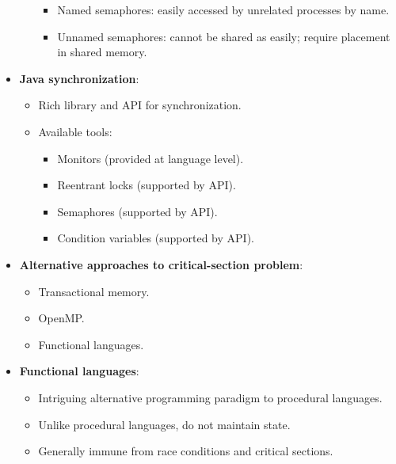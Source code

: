 \begin{itemize}
\begin{itemize}
        \begin{itemize}
            \item Named semaphores: easily accessed by unrelated processes by name.
            \item Unnamed semaphores: cannot be shared as easily; require placement in shared memory.
        \end{itemize}
    \end{itemize}
    \item \textbf{Java synchronization}:
    \begin{itemize}
        \item Rich library and API for synchronization.
        \item Available tools:
        \begin{itemize}
            \item Monitors (provided at language level).
            \item Reentrant locks (supported by API).
            \item Semaphores (supported by API).
            \item Condition variables (supported by API).
        \end{itemize}
    \end{itemize}
    \item \textbf{Alternative approaches to critical-section problem}:
    \begin{itemize}
        \item Transactional memory.
        \item OpenMP.
        \item Functional languages.
    \end{itemize}
    \item \textbf{Functional languages}:
    \begin{itemize}
        \item Intriguing alternative programming paradigm to procedural languages.
        \item Unlike procedural languages, do not maintain state.
        \item Generally immune from race conditions and critical sections.
    \end{itemize}
\end{itemize}
